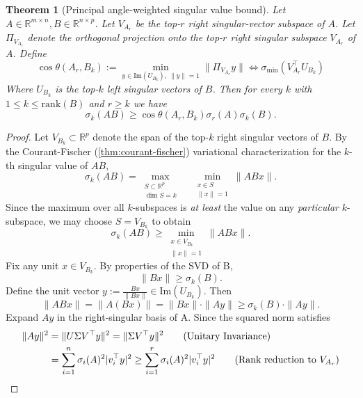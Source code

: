 \documentclass{article}
\newcommand{\prinangle}{\cos\theta}
\theoremstyle{plain}
\newtheorem{theorem}{Theorem}
\theoremstyle{definition}
\theoremstyle{remark}
\begin{document}
\clearpage

\begin{theorem}[Principal angle-weighted singular value bound]
\label{thm:principal-angle-lower-bound}
Let $A \in \mathbb{R}^{m \times n}, B \in \mathbb{R}^{n \times p}$. Let $V_{A_r}$ be the top-$r$ right singular-vector subspace of $A$. Let $\Pi_{V_{A_r}}$ denote the orthogonal projection onto the top-$r$ right singular subspace $V_{A_r}$ of $A$. Define \[
\prinangle(A_r,B_k) := \min_{y \in \mathrm{Im}(U_{B_k}),\: \|y\|=1} \|\Pi_{V_{A_r}}y\| \Leftrightarrow \sigma_{\min}(V_{A_r}^{\top}U_{B_k})
\] Where $U_{B_k}$ is the top-$k$ left singular vectors of $B$. Then for every $k$ with $1 \leq k \leq \mathrm{rank}(B)$ and $r \geq k$ we have \[
    \sigma_k(AB)\geq \prinangle(A_r,B_k) \sigma_r(A)\sigma_k(B).
\]
\end{theorem}
\begin{proof}
Let $V_{B_k} \subset \mathbb{R}^p$ denote the span of the top-$k$ right singular vectors of $B$. By the Courant-Fischer (\cref{thm:courant-fischer}) variational characterization for the $k$-th singular value of $AB$, \[
\sigma_k(AB) = \underset{
\substack{S \subset \mathbb{R}^p \\ \dim S = k}
}{\max} \quad \underset{
\substack{x \in S \\ \|x\| = 1}
}{\min}  \|ABx\|.
\]
Since the maximum over all $k$-subspaces is \textit{at least} the value on any \textit{particular} $k$-subspace, we may choose $S = V_{B_k}$ to obtain 
\begin{equation*}
\label{eq:palb_cf_ineq}
\sigma_k(AB) \geq \underset{
\substack{x \in V_{B_k} \\ \|x\| = 1}
}{\min}  \|ABx\|.
\end{equation*}
Fix any unit $x \in V_{B_k}$. By properties of the SVD of B, \[
\|Bx\| \geq \sigma_k(B).
\]
Define the unit vector $y := \frac{Bx}{\|Bx\|} \in \mathrm{Im}(U_{B_k})$. Then  
\begin{equation}
\label{eq:palbp_ineq_1}
\|ABx\| = \|A(Bx)\| = \|Bx\| \cdot \|Ay\| \geq \sigma_k(B) \cdot \|Ay\|.
\end{equation}
Expand $Ay$ in the right-singular basis of A. Since the squared norm satisfies 
\begin{align*}
\|Ay\|^2 &= \|U\Sigma V^{\top} y\|^2 = \|\Sigma V^{\top} y\|^2 \tag{Unitary Invariance}\\
&= \sum_{i =1}^n \sigma_i(A)^2 |v_i^\top y|^2 \geq  \sum_{i =1}^r \sigma_i(A)^2 |v_i^\top y|^2 \tag{Rank reduction to $V_{A_r}$} \\ 

\end{align*}
\end{proof}
\end{document}
